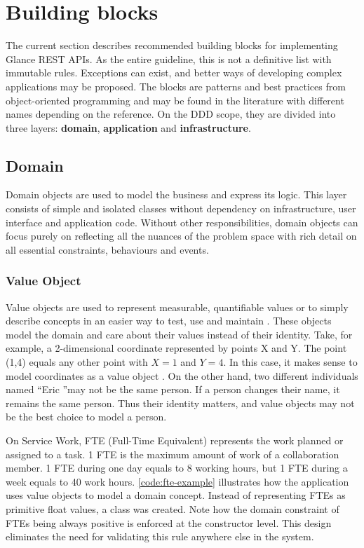 \section{Building blocks}
\label{sec:building-blocks}

The current section describes recommended building blocks for implementing Glance REST APIs. As the entire guideline, this is not a definitive list with immutable rules. Exceptions can exist, and better ways of developing complex applications may be proposed. The blocks are patterns and best practices from object-oriented programming and may be found in the literature with different names depending on the reference. On the DDD scope, they are divided into three layers: \textbf{domain}, \textbf{application} and \textbf{infrastructure}. 

\subsection{Domain}

Domain objects are used to model the business and express its logic. This layer consists of simple and isolated classes without dependency on infrastructure, user interface and application code. Without other responsibilities, domain objects can focus purely on reflecting all the nuances of the problem space with rich detail on all essential constraints, behaviours and events.

\subsubsection{Value Object}
\label{sec:value-object}

Value objects \cite{ddd-blue-book} \cite{ddd-reference} are used to represent measurable, quantifiable values or to simply describe concepts in an easier way to test, use and maintain \cite{ddd-red-book}. These objects model the domain and care about their values instead of their identity. Take, for example, a 2-dimensional coordinate represented by points X and Y. The point (1,4) equals any other point with $X = 1$ and $Y = 4$. In this case, it makes sense to model coordinates as a value object \cite{fowler-value-objects}. On the other hand, two different individuals named ``Eric ''may not be the same person. If a person changes their name, it remains the same person. Thus their identity matters, and value objects may not be the best choice to model a person.

On Service Work, FTE (Full-Time Equivalent) represents the work planned or assigned to a task. 1 FTE is the maximum amount of work of a collaboration member. 1 FTE during one day equals to 8 working hours, but 1 FTE during a week equals to 40 work hours. \autoref{code:fte-example} illustrates how the application uses value objects to model a domain concept. Instead of representing FTEs as primitive float values, a class was created. Note how the domain constraint of FTEs being always positive is enforced at the constructor level. This design eliminates the need for validating this rule anywhere else in the system.

